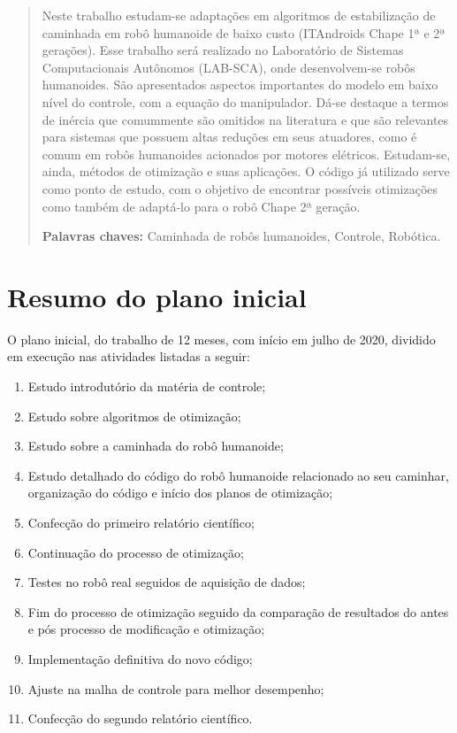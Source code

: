 \maketitle
\thispagestyle{empty}
\begin{abstract}
Neste trabalho estudam-se adaptações em algoritmos de estabilização de caminhada em robô humanoide de baixo custo (ITAndroids Chape 1ª e 2ª gerações). Esse trabalho será realizado no  Laboratório de Sistemas Computacionais Autônomos (LAB-SCA), onde desenvolvem-se robôs humanoides. São apresentados aspectos importantes do modelo em baixo nível do controle, com a equação do manipulador. Dá-se destaque a termos de inércia que comummente são omitidos na literatura e que são relevantes para sistemas que possuem altas reduções em seus atuadores, como é comum em robôs humanoides acionados por motores elétricos. Estudam-se, ainda, métodos de otimização e suas aplicações. O código já utilizado serve como ponto de estudo, com o objetivo de encontrar possíveis otimizações como também de adaptá-lo para o robô Chape 2ª geração.

\noindent \textbf{Palavras chaves:} Caminhada de robôs humanoides, Controle, Robótica.


\end{abstract}
\newpage

\tableofcontents

\newpage
\doublespacing
\section{Resumo do plano inicial}

O plano inicial, do trabalho de 12 meses, com início em julho de 2020, dividido em execução nas atividades listadas a seguir:
\begin{enumerate}[A]
\item{Estudo introdutório da matéria de controle;}
\item{Estudo sobre algoritmos de otimização;}
\item{Estudo sobre a caminhada do robô humanoide;}
\item{Estudo detalhado do código do robô humanoide relacionado ao seu caminhar, organização do código e início dos planos de otimização;}
\item{Confecção do primeiro relatório científico;}
\item{Continuação do processo de otimização;}
\item{Testes no robô real seguidos de aquisição de dados;}
\item{Fim do processo de otimização seguido da comparação de resultados do antes e pós processo de modificação e otimização;}
\item{Implementação definitiva do novo código;}
\item{Ajuste na malha de controle para melhor desempenho;}
\item{Confecção do segundo relatório científico.}
\end{enumerate}

